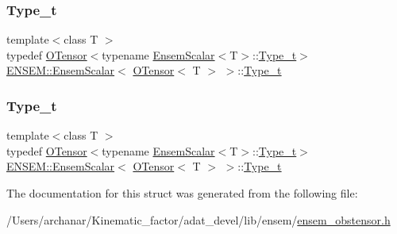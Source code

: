\subsubsection{\texorpdfstring{Type\_t}{Type\_t}\hspace{0.1cm}{\footnotesize\ttfamily [1/2]}}
{\footnotesize\ttfamily template$<$class T $>$ \\
typedef \mbox{\hyperlink{classENSEM_1_1OTensor}{O\+Tensor}}$<$typename \mbox{\hyperlink{structENSEM_1_1EnsemScalar}{Ensem\+Scalar}}$<$T$>$\+::\mbox{\hyperlink{structENSEM_1_1EnsemScalar_3_01OTensor_3_01T_01_4_01_4_ac7c2eed82696db6f601281499248ff83}{Type\+\_\+t}}$>$ \mbox{\hyperlink{structENSEM_1_1EnsemScalar}{E\+N\+S\+E\+M\+::\+Ensem\+Scalar}}$<$ \mbox{\hyperlink{classENSEM_1_1OTensor}{O\+Tensor}}$<$ T $>$ $>$\+::\mbox{\hyperlink{structENSEM_1_1EnsemScalar_3_01OTensor_3_01T_01_4_01_4_ac7c2eed82696db6f601281499248ff83}{Type\+\_\+t}}}

\mbox{\label{structENSEM_1_1EnsemScalar_3_01OTensor_3_01T_01_4_01_4_ac7c2eed82696db6f601281499248ff83}} 
\subsubsection{\texorpdfstring{Type\_t}{Type\_t}\hspace{0.1cm}{\footnotesize\ttfamily [2/2]}}
{\footnotesize\ttfamily template$<$class T $>$ \\
typedef \mbox{\hyperlink{classENSEM_1_1OTensor}{O\+Tensor}}$<$typename \mbox{\hyperlink{structENSEM_1_1EnsemScalar}{Ensem\+Scalar}}$<$T$>$\+::\mbox{\hyperlink{structENSEM_1_1EnsemScalar_3_01OTensor_3_01T_01_4_01_4_ac7c2eed82696db6f601281499248ff83}{Type\+\_\+t}}$>$ \mbox{\hyperlink{structENSEM_1_1EnsemScalar}{E\+N\+S\+E\+M\+::\+Ensem\+Scalar}}$<$ \mbox{\hyperlink{classENSEM_1_1OTensor}{O\+Tensor}}$<$ T $>$ $>$\+::\mbox{\hyperlink{structENSEM_1_1EnsemScalar_3_01OTensor_3_01T_01_4_01_4_ac7c2eed82696db6f601281499248ff83}{Type\+\_\+t}}}



The documentation for this struct was generated from the following file\+:\begin{DoxyCompactItemize}
\item 
/\+Users/archanar/\+Kinematic\+\_\+factor/adat\+\_\+devel/lib/ensem/\mbox{\hyperlink{lib_2ensem_2ensem__obstensor_8h}{ensem\+\_\+obstensor.\+h}}\end{DoxyCompactItemize}
